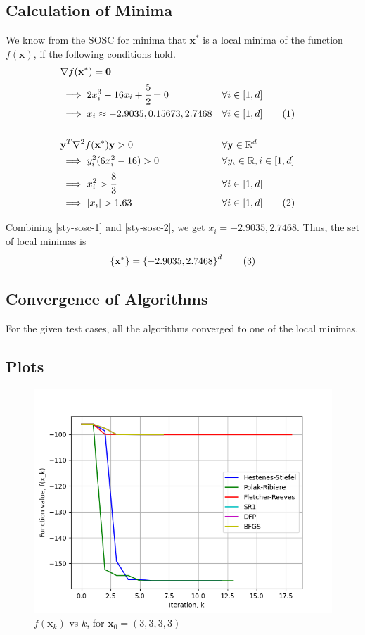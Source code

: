 \documentclass[a4paper]{article}
\newcommand\numberthis{\addtocounter{equation}{1}\tag{\theequation}}
\begin{document}
\subsection{Calculation of Minima}

We know from the SOSC for minima that $\textbf{x}^*$ is a local minima of the function $f(\textbf{x})$, if the following conditions hold.
\begin{align*}
&\nabla f(\textbf{x}^*) = \textbf{0} \\
&\implies 2 x_i^3 - 16 x_i + \cfrac{5}{2} = 0 &&\forall i \in [1, d] \\
&\implies x_i \approx -2.9035, 0.15673, 2.7468 &&\forall i \in [1, d] \numberthis \label{sty-sosc-1} \\ \\
&\textbf{y}^T \nabla^2 f(\textbf{x}^*) \textbf{y} > 0 &&\forall \textbf{y} \in \mathbb{R}^d \\
&\implies y_i^2 (6 x_i^2 - 16) > 0 &&\forall y_i \in \mathbb{R}, i \in [1, d] \\
&\implies x_i^2 > \cfrac{8}{3} &&\forall i \in [1, d] \\
&\implies |x_i| > 1.63 &&\forall i \in [1, d] \numberthis \label{sty-sosc-2}
\end{align*}

Combining \eqref{sty-sosc-1} and \eqref{sty-sosc-2}, we get $x_i = -2.9035, 2.7468$. Thus, the set of local minimas is
\begin{align*}
\left\{\textbf{x}^*\right\} = \left\{-2.9035, 2.7468\right\}^d \numberthis \label{sty-minima}
\end{align*}

\subsection{Convergence of Algorithms}

For the given test cases, all the algorithms converged to one of the local minimas.

\subsection{Plots}

\begin{figure}[H]
    \centering
    \includegraphics[width=.65\textwidth]{styblinski_tang_function_vals.png}
    \caption{$f(\textbf{x}_k)$ vs $k$, for $\textbf{x}_0 = (3, 3, 3, 3)$}
\end{figure}
\end{document}

